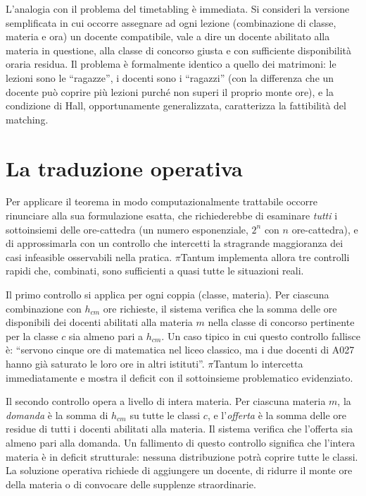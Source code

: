L'analogia con il problema del timetabling \`e immediata.
Si consideri la versione semplificata in cui occorre
assegnare ad ogni lezione (combinazione di classe, materia e
ora) un docente compatibile, vale a dire un docente
abilitato alla materia in questione, alla classe di
concorso giusta e con sufficiente disponibilit\`a oraria
residua. Il problema \`e formalmente identico a quello dei
matrimoni: le lezioni sono le ``ragazze'', i docenti sono i
``ragazzi'' (con la differenza che un docente pu\`o coprire
pi\`u lezioni purch\'e non superi il proprio monte ore), e
la condizione di Hall, opportunamente generalizzata,
caratterizza la fattibilit\`a del matching.

\section{La traduzione operativa}

Per applicare il teorema in modo computazionalmente
trattabile occorre rinunciare alla sua formulazione esatta,
che richiederebbe di esaminare \emph{tutti} i sottoinsiemi
delle ore-cattedra (un numero esponenziale, $2^n$ con $n$
ore-cattedra), e di approssimarla con un controllo che
intercetti la stragrande maggioranza dei casi infeasible
osservabili nella pratica. $\pi$Tantum implementa allora tre
controlli rapidi che, combinati, sono sufficienti a quasi
tutte le situazioni reali.

Il primo controllo si applica per ogni coppia (classe,
materia). Per ciascuna combinazione con $h_{cm}$ ore
richieste, il sistema verifica che la somma delle ore
disponibili dei docenti abilitati alla materia $m$ nella
classe di concorso pertinente per la classe $c$ sia almeno
pari a $h_{cm}$. Un caso tipico in cui questo controllo
fallisce \`e: ``servono cinque ore di matematica nel liceo
classico, ma i due docenti di A027 hanno gi\`a saturato le
loro ore in altri istituti''. $\pi$Tantum lo intercetta
immediatamente e mostra il deficit con il sottoinsieme
problematico evidenziato.

Il secondo controllo opera a livello di intera materia. Per
ciascuna materia $m$, la \emph{domanda} \`e la somma di
$h_{cm}$ su tutte le classi $c$, e l'\emph{offerta} \`e la
somma delle ore residue di tutti i docenti abilitati alla
materia. Il sistema verifica che l'offerta sia almeno pari
alla domanda. Un fallimento di questo controllo significa
che l'intera materia \`e in deficit strutturale: nessuna
distribuzione potr\`a coprire tutte le classi. La soluzione
operativa richiede di aggiungere un docente, di ridurre il
monte ore della materia o di convocare delle supplenze
straordinarie.


